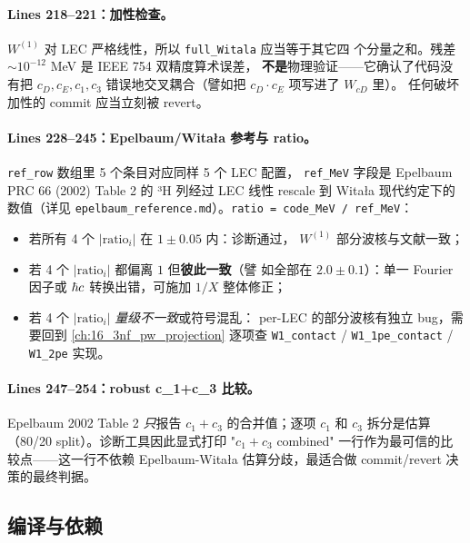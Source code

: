 \paragraph{Lines 218--221：加性检查。}
\(W^{(1)}\) 对 LEC 严格线性，所以 \texttt{full\_Witala} 应当等于其它四
个分量之和。残差 \(\sim 10^{-12}\) MeV 是 IEEE 754 双精度算术误差，
\textbf{不是}物理验证——它确认了代码没有把 \(c_D, c_E, c_1, c_3\)
错误地交叉耦合（譬如把 \(c_D \cdot c_E\) 项写进了 \(W_{cD}\) 里）。
任何破坏加性的 commit 应当立刻被 revert。

\paragraph{Lines 228--245：Epelbaum/Witała 参考与 ratio。}
\texttt{ref\_row} 数组里 5 个条目对应同样 5 个 LEC 配置，
\texttt{ref\_MeV} 字段是 Epelbaum PRC 66 (2002) Table 2 的 ³H 列经过
LEC 线性 rescale 到 Witała 现代约定下的数值（详见
\texttt{epelbaum\_reference.md}）。\texttt{ratio = code\_MeV / ref\_MeV}：

\begin{itemize}
  \item 若所有 4 个 \(|\text{ratio}_i|\) 在 \(1 \pm 0.05\) 内：诊断通过，
        \(W^{(1)}\) 部分波核与文献一致；
  \item 若 4 个 \(|\text{ratio}_i|\) 都偏离 \(1\) 但\textbf{彼此一致}（譬
        如全部在 \(2.0 \pm 0.1\)）：单一 Fourier 因子或 \(\hbar c\)
        转换出错，可施加 \(1/X\) 整体修正；
  \item 若 4 个 \(|\text{ratio}_i|\) \emph{量级不一致}或符号混乱：
        per-LEC 的部分波核有独立 bug，需要回到 \cref{ch:16_3nf_pw_projection}
        逐项查 \texttt{W1\_contact} / \texttt{W1\_1pe\_contact} /
        \texttt{W1\_2pe} 实现。
\end{itemize}

\paragraph{Lines 247--254：robust c\_1+c\_3 比较。}
Epelbaum 2002 Table 2 \emph{只}报告 \(c_1+c_3\) 的合并值；逐项 \(c_1\) 和
\(c_3\) 拆分是估算（80/20 split）。诊断工具因此显式打印
"\(c_1+c_3\) combined" 一行作为最可信的比较点——这一行不依赖
Epelbaum-Witała 估算分歧，最适合做 commit/revert 决策的最终判据。

\subsection{编译与依赖}
\label{subsec:ch17-code-makefile}

